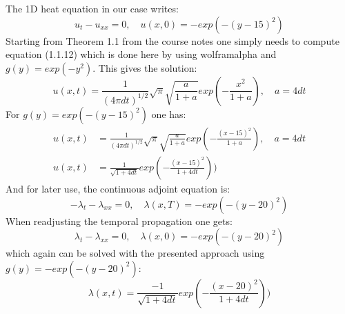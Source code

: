 \documentclass[10pt]{article}
\begin{document}
The 1D heat equation in our case writes:
\begin{equation}
u_t-u_{xx} = 0,\quad u(x,0) = -exp\left( -(y-15)^2 \right)
\end{equation}
Starting from Theorem 1.1 from the course notes one simply needs to compute equation (1.1.12) which is done here by using wolframalpha and $g(y)=exp\left( -y^2 \right)$. This gives the solution:
\begin{equation}
u(x,t) = \frac{1}{(4\pi d t)^{1/2}} \sqrt{\pi} \sqrt{\frac{a}{1+a}}exp\left( -\frac{x^2}{1+a} \right),\quad a= 4dt
\end{equation}
For $g(y)=exp\left( -(y-15)^2 \right)$ one has:
\begin{align}
u(x,t) &= \frac{1}{(4\pi d t)^{1/2}} \sqrt{\pi} \sqrt{\frac{a}{1+a}}exp\left( -\frac{(x-15)^2}{1+a} \right),\quad a= 4dt \\
u(x,t) &= \frac{1}{\sqrt{1+4dt}}exp\left(-\frac{(x-15)^2}{1+4dt} \right))
\end{align}
And for later use, the continuous adjoint equation is:
\begin{equation}
-\lambda_t-\lambda_{xx} = 0,\quad \lambda(x,T) = -exp\left( -(y-20)^2 \right)
\end{equation}
When readjusting the temporal propagation one gets:
\begin{equation}
\lambda_t-\lambda_{xx} = 0,\quad \lambda(x,0) = -exp\left( -(y-20)^2 \right)
\end{equation}
which again can be solved with the presented approach using $g(y)=-exp\left( -(y-20)^2 \right)$:
\begin{equation}
\lambda(x,t) = \frac{-1}{\sqrt{1+4dt}}exp\left(-\frac{(x-20)^2}{1+4dt} \right))
\end{equation}

\end{document}
